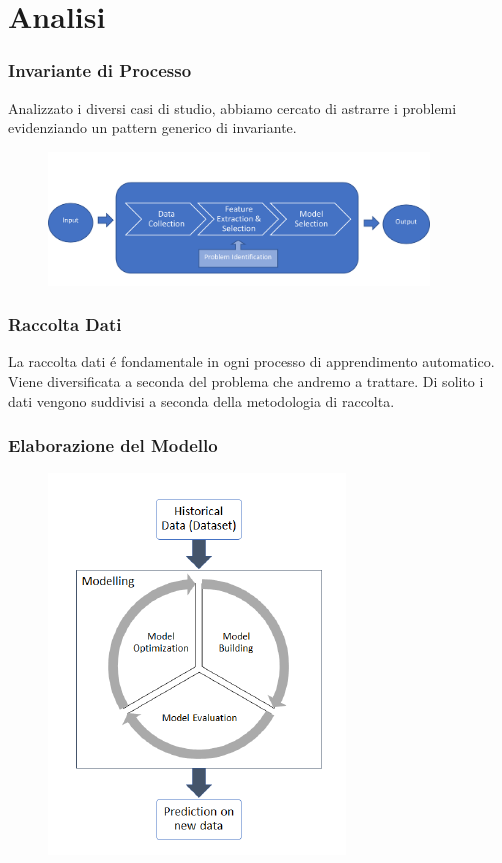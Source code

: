 \documentclass[xcolor=dvipsnames]{beamer}
\begin{document}
\section{Analisi}

\begin{frame}
    \frametitle{Invariante di Processo}
    Analizzato i diversi casi di studio, abbiamo cercato di astrarre i problemi evidenziando un pattern generico di invariante.
    \begin{figure}[htbp]
        \includegraphics[width=0.9\textwidth]{Immagine3.png}
    \end{figure}
\end{frame}

\begin{frame}
    \frametitle{Raccolta Dati}
    La raccolta dati é fondamentale in ogni processo di apprendimento automatico.
    Viene diversificata a seconda del problema che andremo a trattare.
    Di solito i dati vengono suddivisi a seconda della \alert{metodologia di raccolta}.
\end{frame}

\begin{frame}
    \frametitle{Elaborazione del Modello}
    \begin{figure}[htbp]
        \includegraphics{MLProcess.png}
    \end{figure}
\end{frame}
\end{document}
